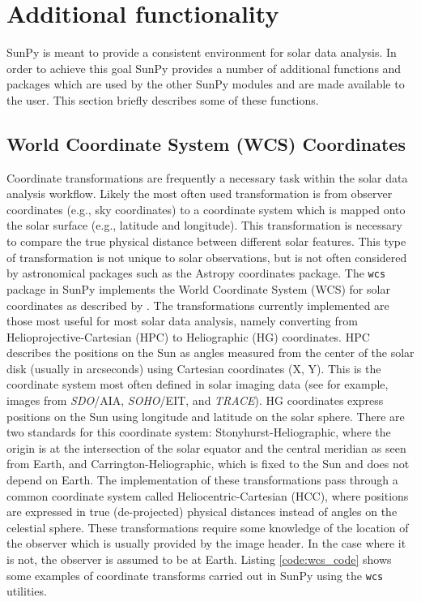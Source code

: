 \section{Additional functionality}\label{sec:util}
SunPy is meant to provide a consistent environment for solar data analysis. In 
order to achieve this goal SunPy provides a number of additional functions and packages which 
are used by the other SunPy modules and are made available to the user. This section 
briefly describes some of these functions.
	
\subsection{World Coordinate System (WCS) Coordinates}\label{ssec:util:wcs}
Coordinate transformations are frequently a necessary task within the solar 
data analysis workflow. Likely the most often used transformation is from 
observer coordinates (e.g., sky coordinates) to a coordinate system which is 
mapped onto the solar surface (e.g., latitude and longitude). This 
transformation is necessary to compare the true physical distance between 
different solar features. This type of transformation is not unique
to solar observations, but is not often considered by astronomical packages
such as the Astropy 
coordinates package. The \texttt{wcs} package in SunPy implements the World Coordinate 
System (WCS) for solar coordinates as described by \citep{thompson2006}. The 
transformations currently implemented are those most useful 
for most solar data analysis, namely converting from Helioprojective-Cartesian 
(HPC) to Heliographic (HG) coordinates. HPC describes the positions on 
the Sun as angles measured from the center of the solar disk (usually in 
arcseconds) using Cartesian coordinates (X, Y). This is the coordinate system 
most often defined in solar imaging data (see for example, images from 
\textit{SDO}/AIA, \textit{SOHO}/EIT, and \textit{TRACE}). 
HG coordinates express positions on the Sun using longitude and latitude on 
the solar sphere. There are two standards for this coordinate system:
Stonyhurst-Heliographic, where the origin is at the intersection of the solar 
equator and the central meridian as seen from Earth, and 
Carrington-Heliographic, which is fixed to the Sun and does not depend on Earth. The 
implementation of these transformations pass through a common coordinate system 
called Heliocentric-Cartesian (HCC), where positions are expressed in true 
(de-projected) physical distances instead of angles on the celestial sphere.
These transformations require some knowledge of the location of the observer 
which is usually provided by the image header. In the case where it is 
not, the observer is assumed to be at Earth. Listing \ref{code:wcs_code} shows 
some examples of coordinate transforms carried out in SunPy using the 
\texttt{wcs} utilities. 

